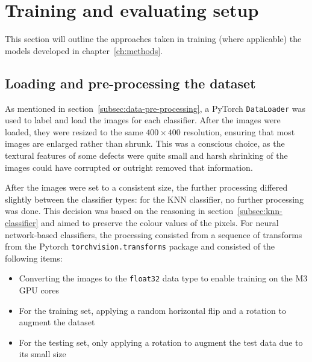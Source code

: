 \section{Training and evaluating setup}
\label{sec:training-and-evaluating-setup}
This section will outline the approaches taken in training (where applicable) the models developed in chapter~\ref{ch:methods}.

\subsection{Loading and pre-processing the dataset}
\label{subsec:loading-and-pre-processing-the-dataset}
As mentioned in section~\ref{subsec:data-pre-processing}, a PyTorch \verb|DataLoader| was used to label and load the images
for each classifier.
After the images were loaded, they were resized to the same $400 \times 400$ resolution, ensuring that most images are
enlarged rather than shrunk.
This was a conscious choice, as the textural features of some defects were quite small and harsh shrinking of the images
could have corrupted or outright removed that information.

After the images were set to a consistent size, the further processing differed slightly between the classifier types:
for the KNN classifier, no further processing was done.
This decision was based on the reasoning in section~\ref{subsec:knn-classifier} and aimed to preserve the colour values of the pixels.
For neural network-based classifiers, the processing consisted from a sequence of transforms from the Pytorch \verb|torchvision.transforms|
package and consisted of the following items:
\begin{itemize}
    \item Converting the images to the \verb|float32| data type to enable training on the M3 GPU cores
    \item For the training set, applying a random horizontal flip and a rotation to augment the dataset
    \item For the testing set, only applying a rotation to augment the test data due to its small size
\end{itemize}

